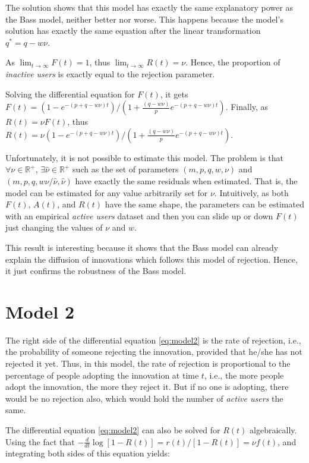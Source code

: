 The solution shows that this model has exactly the same explanatory power as the Bass model, neither better nor worse. This happens because the model's solution has exactly the same equation after the linear transformation $q^* = q - w \nu$.

As $\lim_{t \rightarrow \infty} F(t) = 1$, thus $\lim_{t \rightarrow \infty} R(t) = \nu$. Hence, the proportion of \textit{inactive users} is exactly equal to the rejection parameter.

Solving the differential equation for $F(t)$, it gets $F(t) = (1 - e^{-(p+q-w\nu)t})/(1 + \frac{(q-w\nu)}{p} e^{-(p+q-w\nu)t})$. Finally, as $R(t) = \nu F(t)$, thus $R(t) = \nu (1 - e^{-(p+q-w\nu)t})/(1 + \frac{(q-w\nu)}{p} e^{-(p+q-w\nu)t})$.

Unfortunately, it is not possible to estimate this model. The problem is that $\forall \nu \in \mathbb{R}^+$, $\exists \hat{\nu} \in \mathbb{R}^+$ such as the set of parameters $(m, p, q, w, \nu)$ and $(m, p, q, w\nu/\hat{\nu}, \hat{\nu})$ have exactly the same residuals when estimated. That is, the model can be estimated for any value arbitrarily set for $\nu$. Intuitively, as both $F(t)$, $A(t)$, and $R(t)$ have the same shape, the parameters can be estimated with an empirical \textit{active users} dataset and then you can slide up or down $F(t)$ just changing the values of $\nu$ and $w$.

This result is interesting because it shows that the Bass model can already explain the diffusion of innovations which follows this model of rejection. Hence, it just confirms the robustness of the Bass model.


\section{Model 2}

The right side of the differential equation \ref{eq:model2} is the rate of rejection, i.e., the probability of someone rejecting the innovation, provided that he/she has not rejected it yet. Thus, in this model, the rate of rejection is proportional to the percentage of people adopting the innovation at time $t$, i.e., the more people adopt the innovation, the more they reject it. But if no one is adopting, there would be no rejection also, which would hold the number of \textit{active users} the same.

The differential equation \ref{eq:model2} can also be solved for $R(t)$ algebraically. Using the fact that $-\frac{d}{dt} \log[1 - R(t)] = r(t) / [1 - R(t)] = \nu f(t)$, and integrating both sides of this equation yields:

